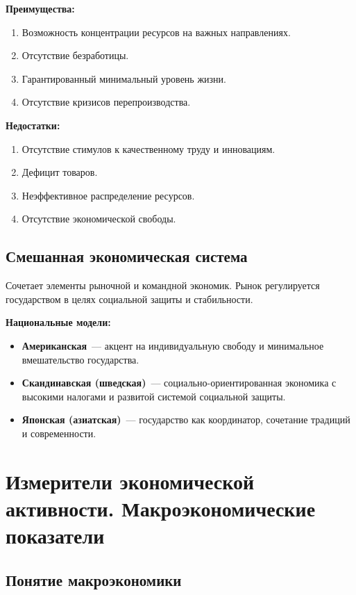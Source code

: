 \documentclass[12pt]{article}
\begin{document}
	\noindent \textbf{Преимущества:}
	\begin{enumerate}
		\item Возможность концентрации ресурсов на важных направлениях.
		\item Отсутствие безработицы.
		\item Гарантированный минимальный уровень жизни.
		\item Отсутствие кризисов перепроизводства.
	\end{enumerate}
	
	\noindent \textbf{Недостатки:}
	\begin{enumerate}
		\item Отсутствие стимулов к качественному труду и инновациям.
		\item Дефицит товаров.
		\item Неэффективное распределение ресурсов.
		\item Отсутствие экономической свободы.
	\end{enumerate}
	
	\subsection{Смешанная экономическая система}
	
	Сочетает элементы рыночной и командной экономик. Рынок регулируется государством в целях социальной защиты и стабильности.
	
	\textbf{Национальные модели:}
	\begin{itemize}
		\item \textbf{Американская}~--- акцент на индивидуальную свободу и минимальное вмешательство государства.
		\item \textbf{Скандинавская (шведская)}~--- социально-ориентированная экономика с высокими налогами и развитой системой социальной защиты.
		\item \textbf{Японская (азиатская)}~--- государство как координатор, сочетание традиций и современности.
	\end{itemize}
	
	\section{Измерители экономической активности. Макроэкономические показатели}
	
	\subsection{Понятие макроэкономики}
	
\end{document}
